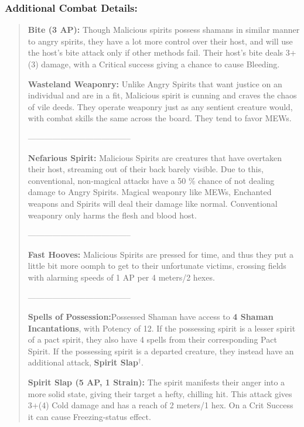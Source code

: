 \documentclass[11pt,a4paper,twocolumn]{book}
\begin{document}
	\subsubsection*{Additional Combat Details:}
	\begin{verse}

		\textbf{Bite (3 AP):} Though Malicious spirits possess shamans in similar manner to angry spirits, they have a lot more control over their host, and will use the host's bite attack only if other methods fail. Their host's bite deals 3+(3) damage, with a Critical success giving a chance to cause Bleeding.		
		
		\textbf{Wasteland Weaponry:} Unlike Angry Spirits that want justice on an individual and are in a fit, Malicious spirit is cunning and craves the chaos of vile deeds. They operate weaponry just as any sentient creature would, with combat skills the same across the board. They tend to favor MEWs.
		
		--------------------------------------
		
		\textbf{Nefarious Spirit:} Malicious Spirits are creatures that have overtaken their host, streaming out of their back barely visible. Due to this, conventional, non-magical attacks have a 50 \% chance of not dealing damage to Angry Spirits. Magical weaponry like MEWs, Enchanted weapons and Spirits will deal their damage like normal. Conventional weaponry only harms the flesh and blood host.
		
		--------------------------------------
		
		\textbf{Fast Hooves:} Malicious Spirits are pressed for time, and thus they put a little bit more oomph to get to their unfortunate victims, crossing fields with alarming speeds of 1 AP per 4 meters/2 hexes.
		
		--------------------------------------
		
		\textbf{Spells of Possession:}Possessed Shaman have access to \textbf{4 Shaman Incantations}, with Potency of 12. If the possessing spirit is a lesser spirit of a pact spirit, they also have 4 spells from their corresponding Pact Spirit. If the possessing spirit is a departed creature, they instead have an additional attack, \textbf{Spirit Slap}$^{\dag}$.
		
		\textbf{\dag Spirit Slap (5 AP, 1 Strain):} The spirit manifests their anger into a more solid state, giving their target a hefty, chilling hit. This attack gives 3+(4) Cold damage and has a reach of 2 meters/1 hex. On a Crit Success it can cause Freezing-status effect.
		
%		
		
	\end{verse}
	
\end{document}
